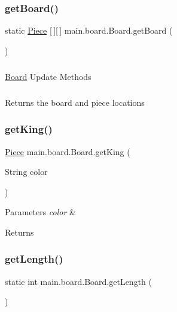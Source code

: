 \subsubsection{\texorpdfstring{get\+Board()}{getBoard()}}
{\footnotesize\ttfamily static \hyperlink{classmain_1_1pieces_1_1_piece}{Piece} \mbox{[}$\,$\mbox{]}\mbox{[}$\,$\mbox{]} main.\+board.\+Board.\+get\+Board (\begin{DoxyParamCaption}{ }\end{DoxyParamCaption})\hspace{0.3cm}{\ttfamily [static]}}

\subparagraph*{}

\hyperlink{classmain_1_1board_1_1_board}{Board} Update Methods \subparagraph*{}

Returns the board and piece locations \hypertarget{classmain_1_1board_1_1_board_ab42d3a7e267e5acb5ca76509a326ec59}{}\label{classmain_1_1board_1_1_board_ab42d3a7e267e5acb5ca76509a326ec59} 
\subsubsection{\texorpdfstring{get\+King()}{getKing()}}
{\footnotesize\ttfamily \hyperlink{classmain_1_1pieces_1_1_piece}{Piece} main.\+board.\+Board.\+get\+King (\begin{DoxyParamCaption}\item[{String}]{color }\end{DoxyParamCaption})}


\begin{DoxyParams}{Parameters}
{\em color} & \\
\hline
\end{DoxyParams}
\begin{DoxyReturn}{Returns}

\end{DoxyReturn}
\hypertarget{classmain_1_1board_1_1_board_a194196590e347f030921920bd507cf6f}{}\label{classmain_1_1board_1_1_board_a194196590e347f030921920bd507cf6f} 
\subsubsection{\texorpdfstring{get\+Length()}{getLength()}}
{\footnotesize\ttfamily static int main.\+board.\+Board.\+get\+Length (\begin{DoxyParamCaption}{ }\end{DoxyParamCaption})\hspace{0.3cm}{\ttfamily [static]}}

